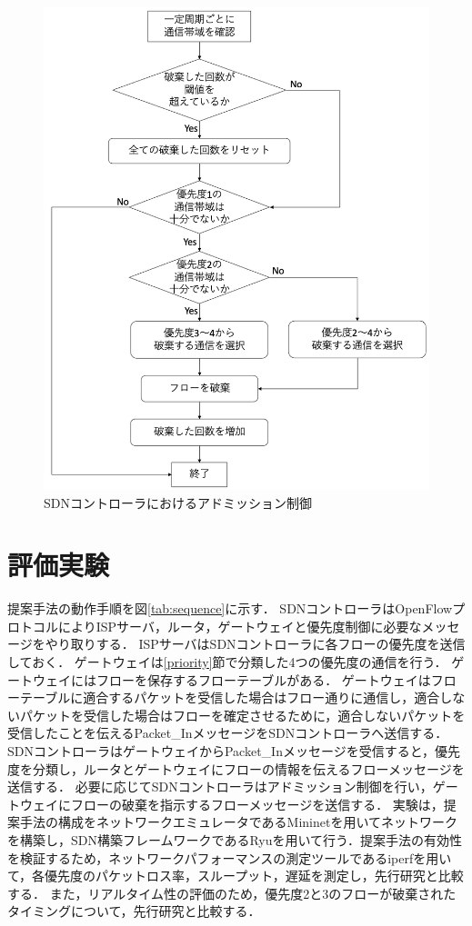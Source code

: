 \documentclass[a4paper,10pt,twocolumn,uplatex]{jsarticle}
\begin{document}
\begin{figure}[t]
	\begin{centering}
    \includegraphics[width=0.75\linewidth]{img/adomission_test2.png}
    \caption{SDNコントローラにおけるアドミッション制御}
    \label{tab:adomission}
    \end{centering}
\end{figure}

\section{評価実験}
提案手法の動作手順を図\ref{tab:sequence}に示す．
SDNコントローラはOpenFlowプロトコルによりISPサーバ，ルータ，ゲートウェイと優先度制御に必要なメッセージをやり取りする．
ISPサーバはSDNコントローラに各フローの優先度を送信しておく．
ゲートウェイは\ref{priority}節で分類した4つの優先度の通信を行う．
ゲートウェイにはフローを保存するフローテーブルがある．
ゲートウェイはフローテーブルに適合するパケットを受信した場合はフロー通りに通信し，適合しないパケットを受信した場合はフローを確定させるために，適合しないパケットを受信したことを伝えるPacket\_InメッセージをSDNコントローラへ送信する．
SDNコントローラはゲートウェイからPacket\_Inメッセージを受信すると，優先度を分類し，ルータとゲートウェイにフローの情報を伝えるフローメッセージを送信する．
必要に応じてSDNコントローラはアドミッション制御を行い，ゲートウェイにフローの破棄を指示するフローメッセージを送信する．
実験は，提案手法の構成をネットワークエミュレータであるMininetを用いてネットワークを構築し，SDN構築フレームワークであるRyuを用いて行う．提案手法の有効性を検証するため，ネットワークパフォーマンスの測定ツールであるiperfを用いて，各優先度のパケットロス率，スループット，遅延を測定し，先行研究と比較する．
また，リアルタイム性の評価のため，優先度2と3のフローが破棄されたタイミングについて，先行研究と比較する．
\end{document}
